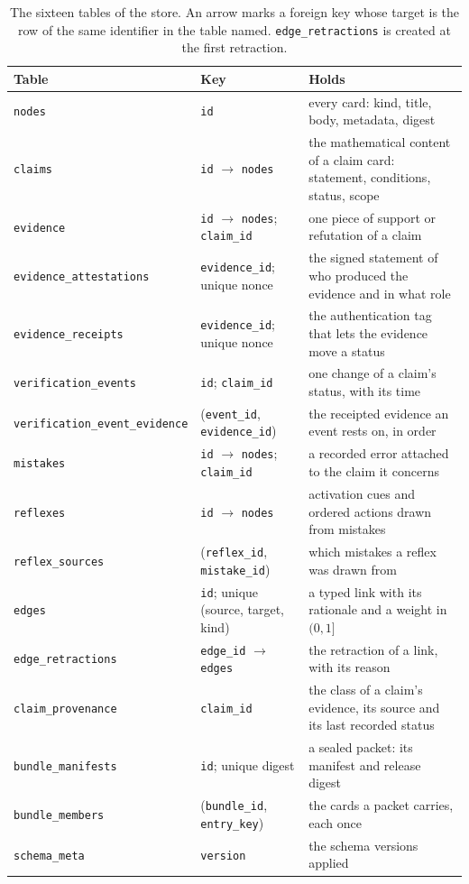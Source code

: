 \begin{table}[ht]
\centering\small
\begin{tabular}{p{4.9cm}p{3.7cm}p{5.7cm}}
\toprule
Table & Key & Holds\\
\midrule
\texttt{nodes} & \texttt{id} & every card: kind, title, body, metadata, digest\\
\texttt{claims} & \texttt{id} $\to$ \texttt{nodes} & the mathematical content of a claim card: statement, conditions, status, scope\\
\texttt{evidence} & \texttt{id} $\to$ \texttt{nodes}; \texttt{claim\_id} & one piece of support or refutation of a claim\\
\texttt{evidence\_attestations} & \texttt{evidence\_id}; unique nonce & the signed statement of who produced the evidence and in what role\\
\texttt{evidence\_receipts} & \texttt{evidence\_id}; unique nonce & the authentication tag that lets the evidence move a status\\
\texttt{verification\_events} & \texttt{id}; \texttt{claim\_id} & one change of a claim's status, with its time\\
\texttt{verification\_event\_evidence} & (\texttt{event\_id}, \texttt{evidence\_id}) & the receipted evidence an event rests on, in order\\
\texttt{mistakes} & \texttt{id} $\to$ \texttt{nodes}; \texttt{claim\_id} & a recorded error attached to the claim it concerns\\
\texttt{reflexes} & \texttt{id} $\to$ \texttt{nodes} & activation cues and ordered actions drawn from mistakes\\
\texttt{reflex\_sources} & (\texttt{reflex\_id}, \texttt{mistake\_id}) & which mistakes a reflex was drawn from\\
\texttt{edges} & \texttt{id}; unique (source, target, kind) & a typed link with its rationale and a weight in $(0,1]$\\
\texttt{edge\_retractions} & \texttt{edge\_id} $\to$ \texttt{edges} & the retraction of a link, with its reason\\
\texttt{claim\_provenance} & \texttt{claim\_id} & the class of a claim's evidence, its source and its last recorded status\\
\texttt{bundle\_manifests} & \texttt{id}; unique digest & a sealed packet: its manifest and release digest\\
\texttt{bundle\_members} & (\texttt{bundle\_id}, \texttt{entry\_key}) & the cards a packet carries, each once\\
\texttt{schema\_meta} & \texttt{version} & the schema versions applied\\
\bottomrule
\end{tabular}
\caption{The sixteen tables of the store. An arrow marks a foreign key whose target is the row of the same identifier in the table named. \texttt{edge\_retractions} is created at the first retraction.}
\label{tab:schema}
\end{table}

